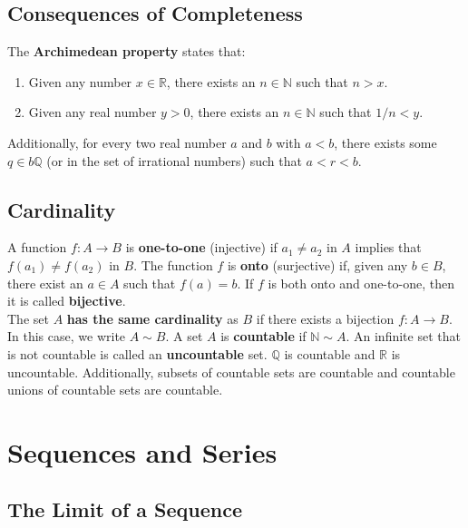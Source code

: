 \documentclass[12pt,letterpaper]{article}
\begin{document}
\subsection{Consequences of Completeness}

The \textbf{Archimedean property} states that:

\begin{enumerate}
	\item Given any number \(x \in \mathbb{R}\), there exists an \(n \in \mathbb{N}\) such that \(n > x\).
	\item Given any real number \(y > 0\), there exists an \(n \in \mathbb{N}\) such that \(1/n < y\).
\end{enumerate}

Additionally, for every two real number \(a\) and \(b\) with \(a < b\), there exists some \(q \in b\mathbb{Q}\) (or in the set of irrational numbers) such that \(a < r < b\).

\subsection{Cardinality}

A function \(f : A \to B\) is \textbf{one-to-one} (injective) if \(a_{1} \neq a_{2}\) in \(A\) implies that \(f(a_{1}) \neq f(a_{2})\) in \(B\). The function \(f\) is \textbf{onto} (surjective) if, given any \(b \in B\), there exist an \(a \in A\) such that \(f(a) = b\). If \(f\) is both onto and one-to-one, then it is called \textbf{bijective}. \\

The set \(A\) \textbf{has the same cardinality} as \(B\) if there exists a bijection \(f : A \to B\). In this case, we write \(A \sim B\). A set \(A\) is \textbf{countable} if \(\mathbb{N} \sim A\). An infinite set that is not countable is called an \textbf{uncountable} set. \(\mathbb{Q}\) is countable and \(\mathbb{R}\) is uncountable. Additionally, subsets of countable sets are countable and countable unions of countable sets are countable.

\pagebreak

\section{Sequences and Series}

\subsection{The Limit of a Sequence}
\end{document}
